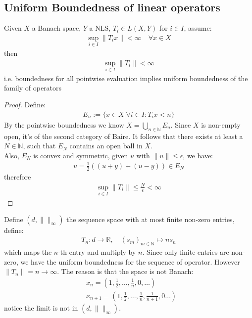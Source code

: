 \subsection{Uniform Boundedness of linear operators}
\begin{theorem}
	Given $X$ a Banach space, $Y$ a NLS, $T_i \in L(X, Y)$ for $i \in I$, assume:
	\begin{align*}
		\sup_{i \in I} \|T_i x\| < \infty \quad \forall x \in X
	\end{align*}
	then
	\begin{align*}
		\sup_{ i \in I} \|T_i\| < \infty
	\end{align*}
	i.e. boundedness for all pointwise evaluation implies uniform boundedness of the family of operators
\end{theorem}
\begin{proof}
Define:
\begin{align*}
	E_n:= \{x \in X| \forall i \in I: T_i x < n \} 
\end{align*}
By the pointwise boundedness we know $X = \bigcup_{n \in \mathbb{N}} E_n$. Since $X$ is non-empty open, it's of the second category of Baire. It follows that there exists at least a $N \in \mathbb{N}$, such that $E_N$ contains an open ball in $X$.\\
Also, $E_N$ is convex and symmetric, given $u$ with $\|u\| \le \epsilon$, we have:
\begin{align*}
	u= \frac{1}{2}( (u + y) + (u - y)) \in E_N
\end{align*}
therefore
\begin{align*}
	\sup_{i \in I} \|T_i\|   \le  \frac{N}{\epsilon} < \infty
\end{align*}
\end{proof}

\begin{example}
Define $(d, \|\|_\infty)$ the sequence space with at most finite non-zero entries, define:
\begin{align*}
	T_n: d \rightarrow \mathbb{R},\quad (s_m)_{m \in \mathbb{N}} \mapsto ns_n
\end{align*}
which maps the $n$-th entry and multiply by $n$. Since only finite entries are non-zero, we have the uniform boundedness for the sequence of operator. However $\|T_n\| = n \rightarrow \infty$. The reason is that the space is not Banach: 
\begin{align*}
	&x_n = (1, \frac{1}{2}, \dots, \frac{1}{n}, 0, \dots)\\
	&x_{n+1} = (1, \frac{1}{2}, \dots, \frac{1}{n}, \frac{1}{n+1}, 0\dots)
\end{align*} 
notice the limit is not in $(d, \|\|_\infty)$.
\end{example}

